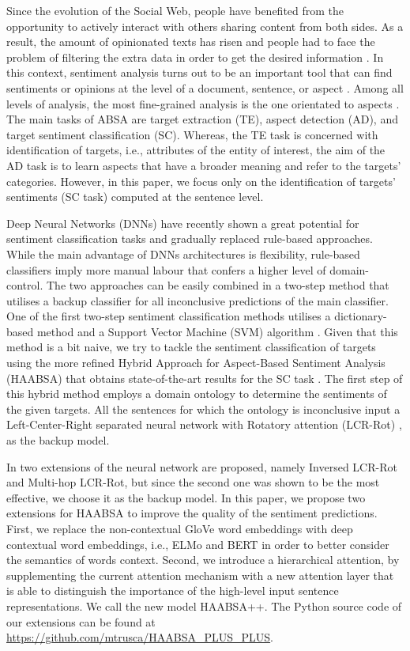 \documentclass[hidelinks]{llncs}
\begin{document}
Since the evolution of the Social Web, people have benefited from the opportunity to actively interact with others sharing content from both sides. As a result, the amount of opinionated texts has risen and people had to face the problem of filtering the extra data in order to get the desired information \cite{schwartz2004paradox}. In this context, sentiment analysis turns out to be an important tool that can find sentiments or opinions at the level of a document, sentence, or aspect \cite{liu2015sentiment}. Among all levels of analysis, the most fine-grained analysis is the one orientated to aspects \cite{schouten2015survey}. The main tasks of ABSA are target extraction (TE), aspect detection (AD), and target sentiment classification (SC). Whereas, the TE task is concerned with identification of targets, i.e., attributes of the entity of interest, the aim of the AD task is to learn aspects that have a broader meaning and refer to the targets' categories. However, in this paper, we focus only on the identification of targets' sentiments (SC task) computed at the sentence level.

Deep Neural Networks (DNNs) have recently shown a great potential for sentiment classification tasks and gradually replaced rule-based approaches. While the main advantage of DNNs architectures is flexibility, rule-based classifiers imply more manual labour that confers a higher level of domain-control. The two approaches can be easily combined in a two-step method that utilises a backup classifier for all inconclusive predictions of the main classifier. One of the first two-step sentiment classification methods utilises a dictionary-based method and a Support Vector Machine (SVM) algorithm \cite{chikersal2015sentu}. Given that this method is a bit naive, we try to tackle the sentiment classification of targets using the more refined Hybrid Approach for Aspect-Based Sentiment Analysis (HAABSA) that obtains state-of-the-art results for the SC task \cite{wallaart2019hybrid}. The first step of this hybrid method employs a domain ontology \cite{schouten2018ontology} to determine the sentiments of the given targets. All the sentences for which the ontology is inconclusive input a Left-Center-Right separated neural network with Rotatory attention (LCR-Rot) \cite{zheng2018left}, as the backup model. 


In \cite{wallaart2019hybrid} two extensions of the neural network are proposed, namely Inversed LCR-Rot and Multi-hop LCR-Rot, but since the second one was shown to be the most effective, we choose it as the backup model. In this paper, we propose two extensions for HAABSA to improve the quality of the sentiment predictions. First, we replace the non-contextual GloVe word embeddings with deep contextual word embeddings, i.e., ELMo \cite{peters2018deep} and BERT \cite{devlin2018bert} in order to better consider the semantics of words context. Second, we introduce a hierarchical attention, by supplementing the current attention mechanism with a new attention layer that is able to distinguish the importance of the high-level input sentence representations. We call the new model HAABSA++. The Python source code of our extensions can be found at \url{https://github.com/mtrusca/HAABSA_PLUS_PLUS}.
\end{document}
